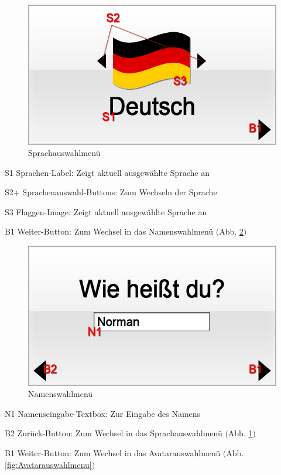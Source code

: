 \begin{figure}[H]
\centering
\includegraphics[scale=0.55]{../gui/_jpeg_numeration/registration1.jpg}
\caption{Sprachauswahlmenü}
\label{fig:Sprachauswahlmenu}
\end{figure}
\begin{description*}
\item[S1] Sprachen-Label: Zeigt aktuell ausgewählte Sprache an
\item[S2+] Sprachenauswahl-Buttons: Zum Wechseln der Sprache
\item[S3] Flaggen-Image: Zeigt aktuell ausgewählte Sprache an
\item[B1] Weiter-Button: Zum Wechsel in das Namenswahlmenü $($Abb. \ref{fig:Namenswahlmenu}$)$
\end{description*}


\begin{figure}[H]
\centering
\includegraphics[scale=0.55]{../gui/_jpeg_numeration/registration2.jpg}
\caption{Namenswahlmenü}
\label{fig:Namenswahlmenu}
\end{figure}
\begin{description*}
\item[N1] Namenseingabe-Textbox: Zur Eingabe des Namens
\item[B2] Zurück-Button: Zum Wechsel in das Sprachauswahlmenü $($Abb. \ref{fig:Sprachauswahlmenu}$)$
\item[B1] Weiter-Button: Zum Wechsel in das Avatarauswahlmenü $($Abb. \ref{fig:Avatarauswahlmenu}$)$
\end{description*}


